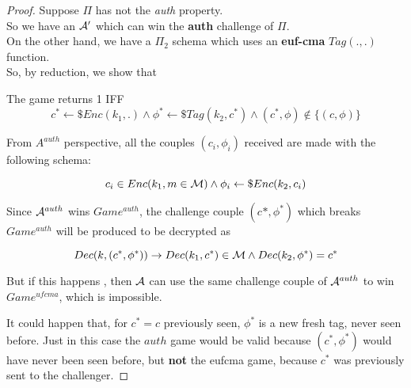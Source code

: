\begin{proof}
    Suppose $\Pi$ has not the \textit{auth}  property.\\ 
    So we have an $\mathcal{A}'$ which can win the \textbf{auth} challenge of $\Pi$.\\
    On the other hand, we have a $\Pi_{2}$ schema which uses an \textbf{euf-cma}
    $Tag(.,.)$ function.\\
    So, by reduction, we show that 
    

\begin{figure}[h!]
   \centering
   \sdinit{}
\end{figure}
The game returns 1 IFF
\[
    c^{*} \leftarrow\$ Enc(k_{1}, . ) \wedge \phi^{*} \leftarrow\$ Tag(k_{2}, c^{*}) \wedge (c^{*}, \phi) \not\in \{ (c, \phi ) \} 
\]

From $A^{auth}$ perspective, all the couples $(c_{i}, \phi_{i})$ received are made with the following schema:

\begin{equation*}
    c_{i} \in Enc(k_{1}, m \in \mathcal{M}) \wedge \phi_{i}\leftarrow\$ Enc(k_{2}, c_{i})
\end{equation*}

Since $\mathcal{A}^{auth}$ wins $Game^{auth}$, the challenge couple $(c^{}{*}, \phi^{*})$ which breaks $Game^{auth}$ will be produced to be decrypted as

\begin{equation*}
    Dec(k, (c^{*}, \phi^{*})) \rightarrow Dec(k_{1}, c^{*}) \in \mathcal{M} \wedge
    Dec(k_{2}, \phi^{*})=c^{*}
\end{equation*}

But if this happens , then $\mathcal{A}$ can use the same challenge couple of $\mathcal{A}^{auth}$ to win $Game^{ufcma}$, which is impossible.

It could happen that, for $c^{*}=c$ previously seen, $\phi^{*}$ is a new fresh tag, never seen before. Just in this case the $auth$ game would be valid because $(c^{*}, \phi^{*})$ would have never been seen before, but \textbf{not } the eufcma game, because $c^{*}$ was previously sent to the challenger.
\end{proof}
    
